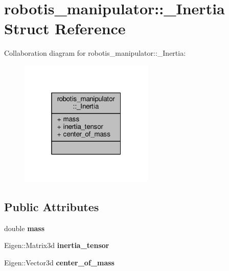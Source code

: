 \hypertarget{structrobotis__manipulator_1_1___inertia}{}\section{robotis\+\_\+manipulator\+:\+:\+\_\+\+Inertia Struct Reference}
\label{structrobotis__manipulator_1_1___inertia}


Collaboration diagram for robotis\+\_\+manipulator\+:\+:\+\_\+\+Inertia\+:
\nopagebreak
\begin{figure}[H]
\begin{center}
\leavevmode
\includegraphics[width=181pt]{structrobotis__manipulator_1_1___inertia__coll__graph}
\end{center}
\end{figure}
\subsection*{Public Attributes}
\begin{DoxyCompactItemize}
\item 
double {\bfseries mass}\hypertarget{structrobotis__manipulator_1_1___inertia_a9e30ea33d00b6583cb7217732cd0c10c}{}\label{structrobotis__manipulator_1_1___inertia_a9e30ea33d00b6583cb7217732cd0c10c}

\item 
Eigen\+::\+Matrix3d {\bfseries inertia\+\_\+tensor}\hypertarget{structrobotis__manipulator_1_1___inertia_ab1c6e632da84d59bd110da734ced38b5}{}\label{structrobotis__manipulator_1_1___inertia_ab1c6e632da84d59bd110da734ced38b5}

\item 
Eigen\+::\+Vector3d {\bfseries center\+\_\+of\+\_\+mass}\hypertarget{structrobotis__manipulator_1_1___inertia_ac0ebadb0c939b18880cb3e7ad961e4a5}{}\label{structrobotis__manipulator_1_1___inertia_ac0ebadb0c939b18880cb3e7ad961e4a5}

\end{DoxyCompactItemize}


